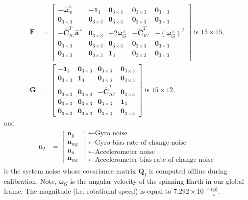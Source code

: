 \documentclass[10pt,letterpaper,fleqn,oneside]{article}
\newcommand{\nl}{\\[0.5em]}
\def\Vec#1{\mathbf{#1}} %
\newcommand{\bbm}{\begin{bmatrix}}
\newcommand{\ebm}{\end{bmatrix}}
\begin{document}
\begin{align}
\Vec{F} &= \bbm	-\hat{\boldsymbol{\omega}}_m^\times & -\Vec{1}_3 & \Vec{0}_{3\times3} & \Vec{0}_{3\times3} & \Vec{0}_{3\times3} \nl
					\Vec{0}_{3\times3} & \Vec{0}_{3\times3} & \Vec{0}_{3\times3} & \Vec{0}_{3\times3} & \Vec{0}_{3\times3} \nl
					-\hat{\Vec{C}}_{I G}^T\hat{\Vec{a}}^\times & \Vec{0}_{3\times3} & -2\boldsymbol{\omega}_G^\times & -\hat{\Vec{C}}_{I G}^T & -\left(\boldsymbol{\omega}_G^\times\right)^2 \nl
					\Vec{0}_{3\times3} & \Vec{0}_{3\times3} & \Vec{0}_{3\times3} & \Vec{0}_{3\times3} & \Vec{0}_{3\times3} \nl
					\Vec{0}_{3\times3} & \Vec{0}_{3\times3} & \Vec{1}_3 & \Vec{0}_{3\times3} & \Vec{0}_{3\times3} \nl
		\ebm \text{ is } 15\times15, \nl
\Vec{G} &= 	\bbm	-\Vec{1}_3 & \Vec{0}_{3\times3} & \Vec{0}_{3\times3} & \Vec{0}_{3\times3} \nl
								\Vec{0}_{3\times3} & \Vec{1}_3 & \Vec{0}_{3\times3} & \Vec{0}_{3\times3} \nl
								\Vec{0}_{3\times3} & \Vec{0}_{3\times3} & -\hat{\Vec{C}}_{I G}^T & \Vec{0}_{3\times3} \nl
								\Vec{0}_{3\times3} & \Vec{0}_{3\times3} & \Vec{0}_{3\times3} & \Vec{1}_3 \nl
								\Vec{0}_{3\times3} & \Vec{0}_{3\times3} & \Vec{0}_{3\times3} & \Vec{0}_{3\times3}
					\ebm \text{ is } 15\times12,
\end{align}
and
\begin{align}
\Vec{n}_I &= \bbm \Vec{n}_g \nl \Vec{n}_{wg} \nl \Vec{n}_a \nl \Vec{n}_{wa} \ebm
					\begin{array}{l}
					\leftarrow \text{Gyro noise} \nl
					\leftarrow \text{Gyro-bias rate-of-change noise} \nl
					\leftarrow \text{Accelerometer noise} \nl
					\leftarrow \text{Accelerometer-bias rate-of-change noise}
					\end{array}		
\end{align}
is the system noise whose covariance matrix $\Vec{Q}_I$ is computed offline during calibration. Note, $\pmb{\omega}_G$ is the angular velocity of the spinning Earth in our global frame. The magnitude (i.e. rotational speed) is equal to $7.292 \times 10^{−5} \frac{\text{rad}}{s}$. 
\end{document}

